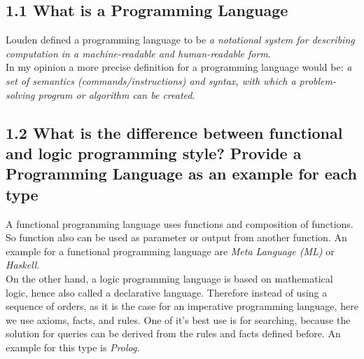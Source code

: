 \documentclass{article}
\begin{document}
	\pagestyle{fancy}
	\hfill
	
	\subsection*{1.1 What is a Programming Language}
	\begin{adjustwidth}{2em}{2em}
		Louden defined a programming language to be \textit{a notational system for describing computation in a machine-readable and human-readable form}. \\
		In my opinion a more precise definition for a programming language would be: \textit{a set of semantics (commands/instructions) and syntax, with which a problem-solving program or algorithm can be created}.
	\end{adjustwidth}
	
	\subsection*{1.2 What is the difference between functional and logic programming style? Provide a Programming Language as an example for each type}
	\begin{adjustwidth}{2em}{2em}
		A functional programming language uses functions and composition of functions. So function also can be used as parameter or output from another function. An example for a functional programming language are \textit{Meta Language (ML)} or \textit{Haskell}. \\
		On the other hand, a logic programming language is based on mathematical logic, hence also called a declarative language. Therefore instead of using a sequence of orders, as it is the case for an imperative programming language, here we use axioms, facts, and rules. One of it's best use is for searching, because the solution for queries can be derived from the rules and facts defined before. An example for this type is \textit{Prolog}.
	\end{adjustwidth}
	
\end{document}
